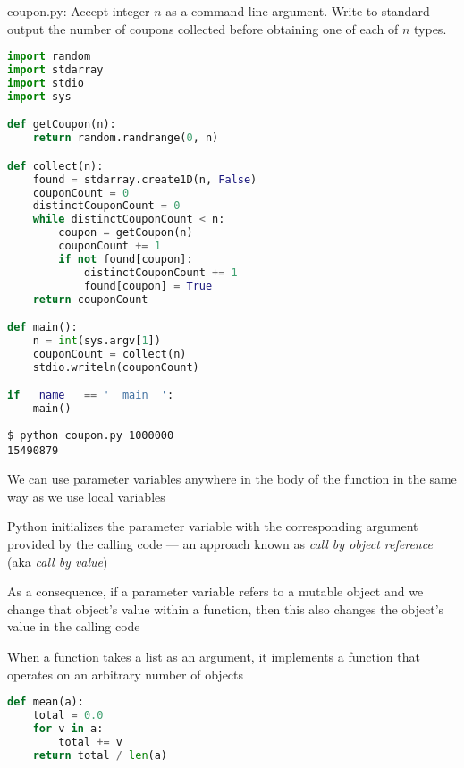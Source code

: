 \documentclass[8pt,a4paper,compress]{beamer}
\begin{document}
\begin{frame}[fragile]
\begin{framed}
\tiny coupon.py: Accept integer $n$ as a command-line argument. Write to standard output the number of coupons collected before obtaining one of each of $n$ types.
\end{framed}

\begin{lstlisting}[language=Python]
import random
import stdarray
import stdio
import sys

def getCoupon(n):
    return random.randrange(0, n)

def collect(n):
    found = stdarray.create1D(n, False)
    couponCount = 0
    distinctCouponCount = 0
    while distinctCouponCount < n:
        coupon = getCoupon(n)
        couponCount += 1
        if not found[coupon]:
            distinctCouponCount += 1
            found[coupon] = True
    return couponCount

def main():
    n = int(sys.argv[1])
    couponCount = collect(n)
    stdio.writeln(couponCount)

if __name__ == '__main__':
    main()
\end{lstlisting}

\begin{lstlisting}[language={}]
$ python coupon.py 1000000
15490879
\end{lstlisting}
\end{frame}

\begin{frame}[fragile]
We can use parameter variables anywhere in the body of the function in the same way as we use local variables

\bigskip

Python initializes the parameter variable with the corresponding argument provided by the calling code --- an approach known as \emph{call by object reference} (aka \emph{call by value})

\bigskip

As a consequence, if a parameter variable refers to a mutable object and we change that object's value within a function, then this also changes the object's value in the calling code

\bigskip

When a function takes a list as an argument, it implements a function that operates on an arbitrary number of objects
\begin{lstlisting}[language=Python]
def mean(a):
    total = 0.0
    for v in a:
        total += v
    return total / len(a)
\end{lstlisting}
\end{frame}
\end{document}
